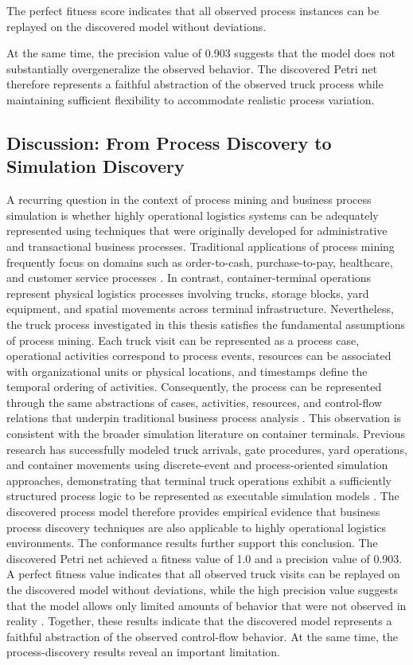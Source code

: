 The perfect fitness score indicates that all observed process instances can be replayed on the discovered model without deviations.

At the same time, the precision value of 0.903 suggests that the model does not substantially overgeneralize the observed behavior. The discovered Petri net therefore represents a faithful abstraction of the observed truck process while maintaining sufficient flexibility to accommodate realistic process variation.

\subsection{Discussion: From Process Discovery to Simulation Discovery} 
A recurring question in the context of process mining and business process simulation is whether highly operational logistics systems can be adequately represented using techniques that were originally developed for administrative and transactional business processes. Traditional applications of process mining frequently focus on domains such as order-to-cash, purchase-to-pay, healthcare, and customer service processes \cite{PMvanDerAalst2016,Aalst2022360Degree}. In contrast, container-terminal operations represent physical logistics processes involving trucks, storage blocks, yard equipment, and spatial movements across terminal infrastructure. Nevertheless, the truck process investigated in this thesis satisfies the fundamental assumptions of process mining. Each truck visit can be represented as a process case, operational activities correspond to process events, resources can be associated with organizational units or physical locations, and timestamps define the temporal ordering of activities. Consequently, the process can be represented through the same abstractions of cases, activities, resources, and control-flow relations that underpin traditional business process analysis \cite{PMvanDerAalst2016}. This observation is consistent with the broader simulation literature on container terminals. Previous research has successfully modeled truck arrivals, gate procedures, yard operations, and container movements using discrete-event and process-oriented simulation approaches, demonstrating that terminal truck operations exhibit a sufficiently structured process logic to be represented as executable simulation models \cite{YUN1999DESSimulation,CTSteenken2004,Bruzzone2012,Bett2024}. The discovered process model therefore provides empirical evidence that business process discovery techniques are also applicable to highly operational logistics environments. The conformance results further support this conclusion. The discovered Petri net achieved a fitness value of 1.0 and a precision value of 0.903. A perfect fitness value indicates that all observed truck visits can be replayed on the discovered model without deviations, while the high precision value suggests that the model allows only limited amounts of behavior that were not observed in reality \cite{aalst2012ConformanceChecking,VinciDeLeoni2025Repair}. Together, these results indicate that the discovered model represents a faithful abstraction of the observed control-flow behavior. At the same time, the process-discovery results reveal an important limitation. 